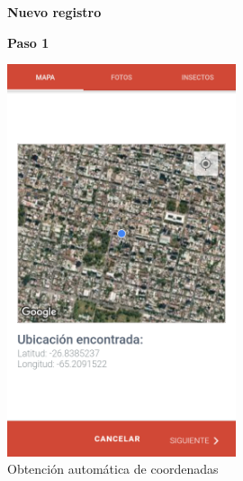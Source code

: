 				\begin{figure}[H]
					\hspace*{1cm}\raggedright\large\textbf{Nuevo registro}\par\medskip
					\centering
					\textbf{Paso 1}\par\medskip
					\includegraphics[width=0.6\textwidth]{Screenshots/registroPaso1.png}
					\caption{Obtención automática de coordenadas}
				\end{figure}
				
